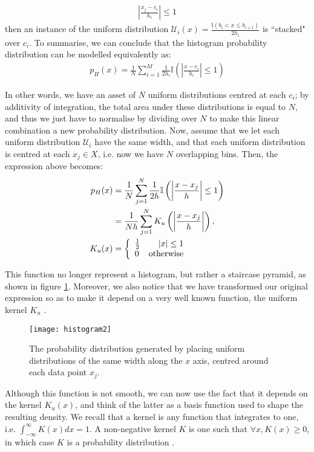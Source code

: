 \documentclass[../main.tex]{subfiles}
\begin{document}
\begin{align*}
\left|\frac{x_j - c_i}{h_i}\right| \leq 1
\end{align*}
then an instance of the uniform distribution $\mathcal{U}_i(x) = \frac{\mathbb{I}(b_i < x \leq b_{i+1})}{2h_i}$ is ``stacked" over $c_i$. To summarise, we can conclude that the histogram probability distribution can be modelled equivalently as:
\begin{align*}
p_H(x) = \frac{1}{N}\sum_{i=1}^M\frac{1}{2h_i}\mathbb{I}\left(\left|\frac{x - c_i}{h_i}\right| \leq 1\right)
\end{align*}
\par In other words, we have an asset of $N$ uniform distributions centred at each $c_i$; by additivity of integration, the total area under these distributions is equal to $N$, and thus we just have to normalise by dividing over $N$ to make this linear combination a new probability distribution. Now, assume that we let each uniform distribution $\mathcal{U}_i$ have the same width, and that each uniform distribution is centred at each $x_j \in X$, i.e. now we have $N$ overlapping bins. Then, the expression above becomes:
\begin{align*}
p_{H}(x) &= \frac{1}{N}\sum_{j=1}^N\frac{1}{2h}\mathbb{I}\left(\left|\frac{x - x_j}{h}\right| \leq 1\right)\\
&= \frac{1}{Nh}\sum_{j=1}^NK_u\left(\left|\frac{x - x_j}{h}\right|\right),\\
K_u(x) &= \left\{
     \begin{array}{lr}
      \frac{1}{2} & \lvert x\rvert \leq 1 \\
      0 & \text{otherwise} 
     \end{array}
   \right.
\end{align*}
\par This function no longer represent a histogram, but rather a staircase pyramid, as shown in figure \ref{fig_hist2}. Moreover, we also notice that we have transformed our original expression so as to make it depend on a very well known function, the uniform kernel $K_u$ \cite{Hansen2009}. 
\begin{figure}[t]
\centering
\texttt{[image: histogram2]}
\caption{The probability distribution generated by placing uniform distributions of the same width along the $x$ axis, centred around each data point $x_j$.}
\label{fig_hist2}
\end{figure}
\par Although this function is not smooth, we can now use the fact that it depends on the kernel $K_u(x)$, and think of the latter as a basis function used to shape the resulting density. We recall that a kernel is any function that integrates to one, i.e. $\int_{-\infty}^\infty K(x)dx = 1$. A non-negative kernel $K$ is one such that $\forall x, K(x) \geq 0$, in which case $K$ is a probability distribution \cite{Hansen2009}.
\end{document}
